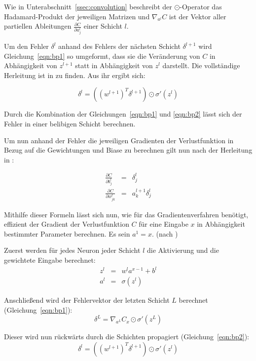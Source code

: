Wie in Unterabschnitt~\ref{ssec:convolution} beschreibt der $\odot$-Operator das Hadamard-Produkt der jeweiligen Matrizen und $\nabla_{a^l} C$ ist der Vektor aller partiellen Ableitungen $\frac{\partial C}{\partial a_j^l}$ einer Schicht $l$.

Um den Fehler $\delta^l$  anhand des Fehlers der nächsten Schicht $\delta^{l+1}$ wird Gleichung~\ref{eqn:bp1} so umgeformt, dass sie die Veränderung von $C$ in Abhängigkeit von $z^{l+1}$ statt in Abhängigkeit von $z^{l}$ darstellt. Die vollständige Herleitung ist in \cite[Kap.~2]{kathuria_18} zu finden. Aus ihr ergibt sich:

\begin{equation}
\label{eqn:bp2}
\delta^l =\left(\left(w^{l+1}\right)^T\delta^{l+1}\right)\odot\sigma'\left(z^l\right)
\end{equation}

Durch die Kombination der Gleichungen~\ref{eqn:bp1} und \ref{eqn:bp2} lässt sich der Fehler in einer belibigen Schicht berechnen.

Um nun anhand der Fehler die jeweiligen Gradienten der Verlustfunktion in Bezug auf die Gewichtungen und Biase zu berechnen gilt nun nach der Herleitung in \cite[Kap.~2]{kathuria_18}:

\begin{eqnarray}
\label{eqn:bp3}
\frac{\partial C}{\partial b_j^l} &=& \delta_j^l\\
\label{eqn:bp4}
\frac{\partial C}{\partial w_{jk}^l} &=& a_k^{l+1}\delta_j^l
\end{eqnarray}

Mithilfe dieser Formeln lässt sich nun, wie für das Gradientenverfahren benötigt, effizient der Gradient der Verlustfunktion $C$ für eine Eingabe $x$ in Abhängigkeit bestimmter Parameter berechnen. Es sein $a^1=x$. (nach \cite[Kap.~2]{nielsen_15})

Zuerst werden für jedes Neuron jeder Schicht $l$ die Aktivierung und die gewichtete Eingabe berechnet:
\begin{eqnarray}
z^{l}&=& w^{l}a^{x-1}+b^l\\
a^{l}&=&\sigma\left(z^{l}\right)
\end{eqnarray}

Anschließend wird der Fehlervektor der letzten Schicht $L$ berechnet (\vgl Gleichung~\ref{eqn:bp1}):
\begin{equation}
\delta^{L}=\nabla_{a^L}C_x\odot\sigma'\left(z^{L}\right)
\end{equation}

Dieser wird nun rückwärts durch die Schichten propagiert (\vgl Gleichung~\ref{eqn:bp2}):
\begin{equation}
\delta^{l}=\left(\left(w^{l+1}\right)^T\delta^{l+1}\right)\odot\sigma'\left(z^{l}\right)
\end{equation}

